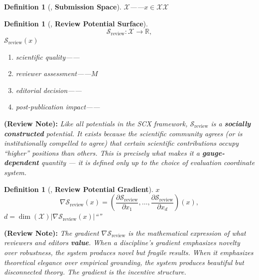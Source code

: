\documentclass[12pt,a4paper]{article}
\newtheorem{definition}[theorem]{Definition}
\theoremstyle{remark}
\newcommand{\R}{\mathbb{R}}
\newcommand{\reviewSurf}{\mathcal{S}_{\text{review}}}
\newcommand{\reviewGrad}{\nabla\reviewSurf}
\newcommand{\reviewnote}[1]{%
    \medskip\noindent
    \textbf{ (Review Note):} \textit{#1}%
}
\begin{document}
\subsection{}

\begin{definition}[, \textbf{Submission Space}]
\label{def:submission_space}
$\mathcal{X}$\textbf{}——$x \in \mathcal{X}$$\mathcal{X}$
\end{definition}

\begin{definition}[, \textbf{Review Potential Surface}]
\label{def:review_potential}
\textbf{}
\begin{equation}
    \reviewSurf: \mathcal{X} \to \R,
    \label{eq:review_surface}
\end{equation}
$\reviewSurf(x)$
\begin{enumerate}[label=(\roman*)]
    \item \textbf{}scientific quality——
    \item \textbf{}reviewer assessment——$M$
    \item \textbf{}editorial decision——
    \item \textbf{}post-publication impact——
\end{enumerate}
\end{definition}

\reviewnote{Like all potentials in the SCX framework, $\reviewSurf$ is a \textbf{socially constructed} potential. It exists because the scientific community agrees (or is institutionally compelled to agree) that certain scientific contributions occupy ``higher'' positions than others. This is precisely what makes it a \textbf{gauge-dependent} quantity — it is defined only up to the choice of evaluation coordinate system.}

\begin{definition}[, \textbf{Review Potential Gradient}]
\label{def:review_gradient}
$x$\textbf{}
\begin{equation}
    \reviewGrad(x) = \left(\frac{\partial \reviewSurf}{\partial x_1}, \dots, \frac{\partial \reviewSurf}{\partial x_d}\right)(x),
    \label{eq:review_gradient}
\end{equation}
$d = \dim(\mathcal{X})$$|\reviewGrad(x)|$\textbf{}``''
\end{definition}

\reviewnote{The gradient $\reviewGrad$ is the mathematical expression of what reviewers and editors \textbf{value}. When a discipline's gradient emphasizes novelty over robustness, the system produces novel but fragile results. When it emphasizes theoretical elegance over empirical grounding, the system produces beautiful but disconnected theory. The gradient \textit{is} the incentive structure.}
\end{document}

